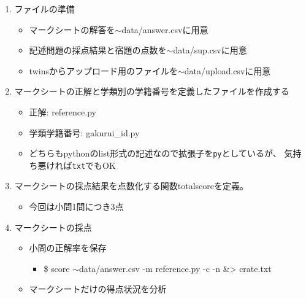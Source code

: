 \begin{enumerate}
\item ファイルの準備

\begin{itemize}
\item マークシートの解答を\ensuremath{\sim}data\slash answer.csvに用意

\item 記述問題の採点結果と宿題の点数を\ensuremath{\sim}data\slash sup.csvに用意

\item twinsからアップロード用のファイルを\ensuremath{\sim}data\slash upload.csvに用意

\end{itemize}

\item マークシートの正解と学類別の学籍番号を定義したファイルを作成する

\begin{itemize}
\item 正解: reference.py

\item 学類学籍番号: gakurui\_id.py

\item どちらもpythonのlist形式の記述なので拡張子を\texttt{py}としているが、
気持ち悪ければ\texttt{txt}でもOK

\end{itemize}

\item マークシートの採点結果を点数化する関数totalscoreを定義。

\begin{itemize}
\item 今回は小問1問につき3点

\end{itemize}

\item マークシートの採点

\begin{itemize}
\item 小問の正解率を保存

\begin{itemize}
\item \$ score \ensuremath{\sim}data\slash answer.csv -m reference.py -c -n \&> crate.txt

\end{itemize}

\item マークシートだけの得点状況を分析


\end{itemize}
\end{enumerate}
